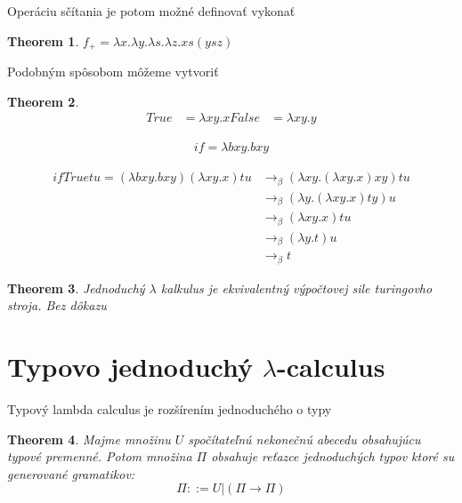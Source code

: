 \documentclass[a4paper,10pt,oneside]{report}%
\newtheorem{theorem}{Theorem}
\begin{document}
Operáciu sčítania je potom možné definovať vykonať
\begin{theorem}
    $f_{+} = \lambda x. \lambda y. \lambda s. \lambda z. x s (y s z)$
\end{theorem}

Podobným spôsobom môžeme vytvoriť 
\begin{theorem}
    \begin{align}
        True &= \lambda x y . x
        False &= \lambda x y . y
    \end{align}
\end{theorem}

\begin{align}
    if = \lambda b x y . b x y
\end{align}

\begin{align*}
    if True t u = (\lambda bxy.bxy)(\lambda xy.x) tu & \to_{\beta} (\lambda xy.(\lambda xy.x)xy)tu \\
                                                     & \to_{\beta} (\lambda y.( \lambda xy.x)ty)u \\
                                                     & \to_{\beta} (\lambda xy.x)tu \\
                                                     & \to_{\beta} (\lambda y.t)u \\
                                                     & \to_{\beta} t
\end{align*}

\begin{theorem}
    Jednoduchý $\lambda$ kalkulus je ekvivalentný výpočtovej sile turingovho stroja.
    Bez dôkazu
\end{theorem}

\section{Typovo jednoduchý $\lambda$-calculus}

Typový lambda calculus je rozšírením jednoduchého o typy

\begin{theorem}
    Majme množinu $U$ spočítateľnú nekonečnú abecedu obsahujúcu typové premenné.
    Potom množina $\Pi$ obsahuje reťazce jednoduchých typov ktoré su generované
    gramatikov:
    \begin{equation}
        \Pi ::= U | (\Pi \to \Pi)
    \end{equation}
\end{theorem}
\end{document}

